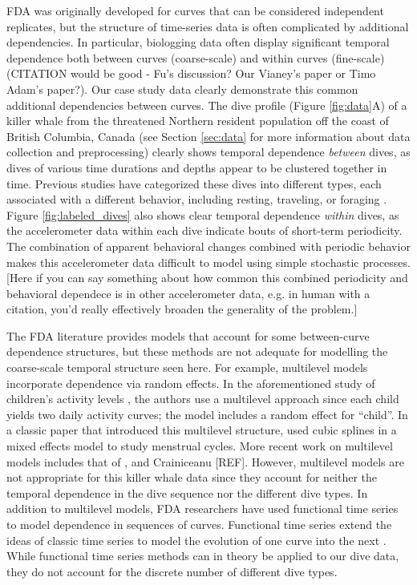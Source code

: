 FDA was originally developed for curves that can be considered independent replicates, but the structure of time-series data is often complicated by additional dependencies. In particular, biologging data often display significant temporal dependence both between curves (coarse-scale) and within curves (fine-scale) (CITATION would be good - Fu's discussion? Our Vianey's paper or Timo Adam's paper?). Our case study data clearly demonstrate this common additional dependencies between curves. The dive profile (Figure \ref{fig:data}A) of a killer whale from the threatened Northern resident population off the coast of British Columbia, Canada (see Section \ref{sec:data} for more information about data collection and preprocessing) clearly shows temporal dependence \textit{between} dives, as dives of various time durations and depths appear to be clustered together in time. Previous studies have categorized these dives into different types, each associated with a different behavior, including resting, traveling, or foraging \citep{Tennessen:2019b}.
Figure {\ref{fig:labeled_dives}} also shows clear temporal dependence \textit{within} dives, as the accelerometer data within each dive indicate bouts of short-term periodicity. The combination of apparent behavioral changes combined with periodic behavior makes this accelerometer data difficult to model using simple stochastic processes. [Here if you can say something about how common this combined periodicity and behavioral dependece is in other accelerometer data, e.g. in human with a citation, you'd really effectively broaden the generality of the problem.]

The FDA literature provides models that account for some between-curve dependence structures, but these methods are not adequate for modelling the coarse-scale temporal structure seen here. For example, multilevel models incorporate dependence via random effects. In the aforementioned study of children's activity levels \citep{Morris:2007}, the authors use a multilevel approach since each child yields two daily activity curves; the model includes a random effect for ``child''. In a classic paper that introduced this multilevel structure,  \cite{Bromback:1998} used cubic splines in a mixed effects model to study menstrual cycles. More recent work on multilevel models includes that of \cite{di:2009}, \cite{chen:2012} and Crainiceanu [REF]. However, multilevel models are not appropriate for this killer whale data since they account for neither the temporal dependence in the dive sequence nor the different dive types. 
In addition to multilevel models, FDA researchers have used functional time series to model dependence in sequences of curves. Functional time series extend the ideas of classic time series to model the evolution of one curve into the next \citep{Kokoszka:2018}. While functional time series methods can in theory be applied to our dive data, they do not account for the discrete number of different dive types.
 

